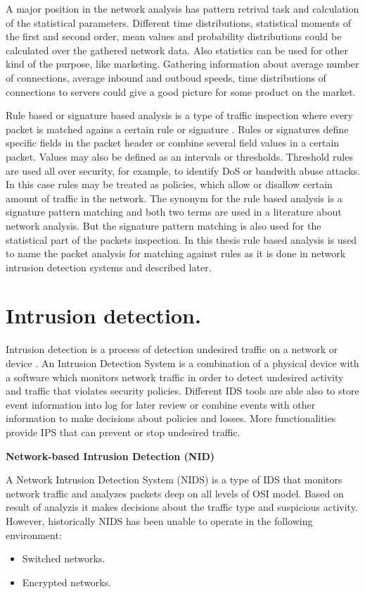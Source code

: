 \documentclass[thesis=M,english]{FITthesis}[2011/07/15]
\begin{document}
A major position in the network analysis has pattern retrival task and calculation of the statistical parameters. Different time distributions, statistical moments of the first and second order, mean values and probability distributions could be calculated over the gathered network data. Also statistics can be used for other kind of the purpose, like marketing. Gathering information about average number of connections, average inbound and outboud speeds, time distributions of connections to servers could give a good picture for some product on the market.

Rule based or signature based analysis is a type of traffic inspection where every packet is matched agains a certain rule or signature \cite{rule_based_analysis}. Rules or signatures define specific fields in the packet header or combine several field values in a certain packet. Values may also be defined as an intervals or thresholds. Threshold rules are used all over security, for example, to identify DoS or bandwith abuse attacks. In this case rules may be treated as policies, which allow or disallow certain amount of traffic in the network.
The synonym for the rule based analysis is a signature pattern matching and both two terms are used in a literature about network analysis. But the signature pattern matching is also used for the statistical part of the packets inspection. In this thesis rule based analysis is used to name the packet analysis for matching against rules as it is done in network intrusion detection systems and described later. 

\section{Intrusion detection.}
Intrusion detection is a process of detection undesired traffic on a network or device \cite{nids_evolution}. An Intrusion Detection System is a combination of a physical device with a software which monitors network traffic in order to detect undesired activity and traffic that violates security policies. Different IDS tools are able also to store event information into log for later review or combine events with other information to make decisions about policies and losses. More functionalities provide IPS that can prevent or stop undesired traffic.

\textbf{Network-based Intrusion Detection (NID)}

A Network Intrusion Detection System (NIDS) is a type of IDS that monitors network traffic and analyzes packets deep on all levels of OSI model. Based on result of analyzis it makes decisions about the traffic type and suspicious activity. However, historically NIDS has been unable to operate in the following environment:
\begin{itemize}
\item Switched networks.
\item Encrypted networks.
\end{itemize}
\end{document}
